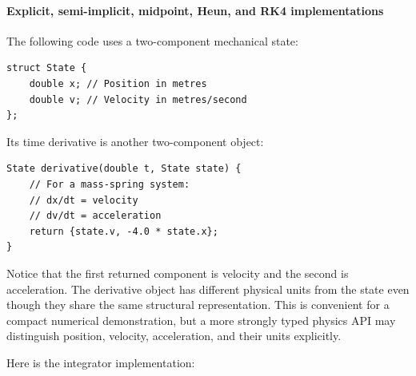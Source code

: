 \paragraph{Explicit, semi-implicit, midpoint, Heun, and RK4 implementations}\label{02-foundations-ii-ch025-explicit-semi-implicit-midpoint-heun-and-rk4-implementations}

\hypertarget{02-foundations-ii-ch025-explicit-semi-implicit-midpoint-heun-and-rk4-implementations}{}

The following code uses a two-component mechanical state:

\begin{verbatim}
struct State {
    double x; // Position in metres
    double v; // Velocity in metres/second
};
\end{verbatim}

Its time derivative is another two-component object:

\begin{verbatim}
State derivative(double t, State state) {
    // For a mass-spring system:
    // dx/dt = velocity
    // dv/dt = acceleration
    return {state.v, -4.0 * state.x};
}
\end{verbatim}

Notice that the first returned component is velocity and the second is acceleration. The derivative object has different physical units from the state even though they share the same structural representation. This is convenient for a compact numerical demonstration, but a more strongly typed physics API may distinguish position, velocity, acceleration, and their units explicitly.

Here is the integrator implementation:

